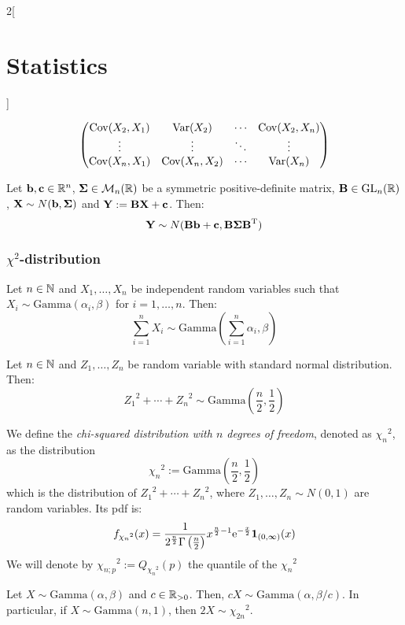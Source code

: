 \documentclass[../../../main.tex]{subfiles}
\begin{document}
\begin{multicols}{2}[\section{Statistics}]
\begin{proposition}
\begin{gather*}
\begin{pmatrix}
        \operatorname{Cov}(X_2,X_1) & \operatorname{Var}(X_2)     & \cdots & \operatorname{Cov}(X_2,X_n) \\
        \vdots        & \vdots        & \ddots & \vdots        \\
        \operatorname{Cov}(X_n,X_1) & \operatorname{Cov}(X_n,X_2) & \cdots & \operatorname{Var}(X_n)     \\
      \end{pmatrix}
    \end{gather*}
  \end{proposition}
  \begin{proposition}
    Let $\boldsymbol{\mathrm{b}},\boldsymbol{\mathrm{c}}\in\mathbb{R}^n$, $\boldsymbol{\mathrm{\Sigma}}\in\mathcal{M}_n(\mathbb{R})$ be a symmetric positive-definite matrix, $\boldsymbol{\mathrm{B}}\in\mathrm{GL}_n(\mathbb{R})$, $\boldsymbol{\mathrm{X}}\sim N(\boldsymbol{\mathrm{b}},\boldsymbol{\mathrm{\Sigma}})$ and $\boldsymbol{\mathrm{Y}}:=\boldsymbol{\mathrm{BX}}+\boldsymbol{\mathrm{c}}$. Then: $$\boldsymbol{\mathrm{Y}}\sim N(\boldsymbol{\mathrm{Bb}}+\boldsymbol{\mathrm{c}},\boldsymbol{\mathrm{B\Sigma}}\vb{\boldsymbol{\mathrm{B}}}^{\mathrm{T}})$$
  \end{proposition}
  \subsubsection{\texorpdfstring{$\chi^2$}{chi2}-distribution}
  \begin{proposition}
    Let $n\in\mathbb{N}$ and $X_1,\ldots,X_n$ be independent random variables such that $X_i\sim \text{Gamma}(\alpha_i,\beta)$ for $i=1,\ldots,n$. Then: $$\sum_{i=1}^nX_i\sim\text{Gamma}\left(\sum_{i=1}^n\alpha_i,\beta\right)$$
  \end{proposition}
  \begin{corollary}
    Let $n\in\mathbb{N}$ and $Z_1,\ldots,Z_n$ be \iid random variable with standard normal distribution. Then: $${Z_1}^2+\cdots+{Z_n}^2\sim\text{Gamma}\left(\frac{n}{2},\frac{1}{2}\right)$$
  \end{corollary}
  \begin{definition}
    We define the \emph{chi-squared distribution with $n$ degrees of freedom}, denoted as ${\chi_n}^2$, as the distribution $${\chi_n}^2:=\text{Gamma}\left(\frac{n}{2},\frac{1}{2}\right)$$ which is the distribution of ${Z_1}^2+\cdots+{Z_n}^2$, where $Z_1,\ldots,Z_n\sim N(0,1)$ are \iid random variables. Its pdf is:
    $$f_{{\chi_n}^2}(x)=\frac{1}{2^\frac{n}{2}\Gamma\left(\frac{n}{2}\right)}x^{\frac{n}{2}-1}\mathrm{e}^{-\frac{x}{2}}\boldsymbol{\mathrm{1}}_{(0,\infty)}(x)$$
    We will denote by ${\chi_{n;p}}^2:=Q_{{\chi_n}^2}(p)$ the quantile of the ${\chi_n}^2$
  \end{definition}
  \begin{proposition}
    Let $X\sim\text{Gamma}(\alpha,\beta)$ and $c\in\mathbb{R}_{>0}$. Then, $cX\sim\text{Gamma}(\alpha,\beta/c)$. In particular, if $X\sim\text{Gamma}(n,1)$, then $2X\sim {\chi_{2n}}^2$.
  \end{proposition}

\end{multicols}
\end{document}
